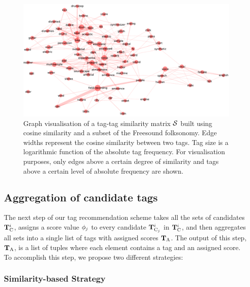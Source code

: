 \begin{figure}
  \centerline{
  \includegraphics[width=\figSizeMax]{ch03_general/pics/01_graph_visualisation.pdf}}
  \caption[Graph visualisation of a tag-tag similarity matrix $\similarityMatrix$]{Graph visualisation of a tag-tag similarity matrix $\similarityMatrix$ built using cosine similarity and a subset of the Freesound folksonomy. Edge widths represent the cosine similarity between two tags. Tag size is a logarithmic function of the absolute tag frequency. For visualisation purposes, only edges above a certain degree of similarity and tags above a certain level of absolute frequency are shown.
  }
  \label{general:fig:graph}
\end{figure}


\subsection{Aggregation of candidate tags}
\label{sec:gen:step_2_aggregation}

The next step of our tag recommendation scheme takes all the sets of candidates $\mathbf{T}_{\text{C}}^i$, assigns a score value $\phi_j$ to every candidate $\mathbf{T}^i_{\text{C}_j}$ in $\mathbf{T}_{\text{C}}^i$, and then aggregates all sets into a single list of tags with assigned scores $\mathbf{T}_{\text{A}}$. The output of this step, $\mathbf{T}_{\text{A}}$, is a list of tuples where each element contains a tag and an assigned score. To accomplish this step, we propose two different strategies:


\subsubsection{Similarity-based Strategy}

